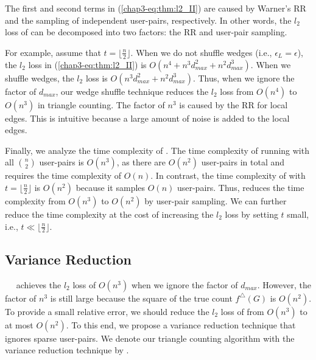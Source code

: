 The first and second terms in (\ref{chap3-eq:thm:l2_II}) are caused by 
Warner's RR 
and the sampling of independent user-pairs, respectively. 
In other words, the $l_2$ loss of \AlgWSTri{} can be decomposed into two factors: the RR 
and user-pair sampling. 

For example, assume that $t = \lfloor \frac{n}{2} \rfloor$. 
When we do not shuffle wedges (i.e., $\epsilon_L = \epsilon$), the $l_2$ loss in (\ref{chap3-eq:thm:l2_II}) is $O(n^4 + n^3 d_{max}^2 + n^2 d_{max}^3)$. 
When we shuffle wedges, the $l_2$ loss is $O(n^3 d_{max}^2 + n^2 d_{max}^3)$. 
Thus, when we ignore the factor of $d_{max}$, our wedge shuffle technique reduces the $l_2$ loss from $O(n^4)$ to $O(n^3)$ in triangle counting. 
The factor of $n^3$ is caused by the RR for local edges. 
This is intuitive because a large amount of noise is added to the local edges. 

Finally, we analyze the time complexity of \AlgWSTri{}. 
The time complexity of running \AlgWSLE{} with all $\binom{n}{2}$ user-pairs is $O(n^3)$, as there are $O(n^2)$ user-pairs in total and \AlgWSLE{} requires the time complexity of $O(n)$. 
In contrast, the time complexity of \AlgWSTri{} with $t = \lfloor \frac{n}{2} \rfloor$ is $O(n^2)$ because it samples $O(n)$ user-pairs. 
Thus, \AlgWSTri{} reduces the time complexity from $O(n^3)$ to $O(n^2)$ by user-pair sampling. 
We can further reduce the time complexity at the cost of increasing the $l_2$ loss 
by setting $t$ small, 
i.e., $t \ll \lfloor \frac{n}{2} \rfloor$. 

\subsection{Variance Reduction}
\label{chap3-sub:var_red}
~~\AlgWSTri{} 
achieves the $l_2$ loss of $O(n^3)$ when we ignore the factor of $d_{max}$. 
However, the factor of $n^3$ is still large because the square of the true count $f^\triangle(G)$ is $O(n^2)$. 
To provide a small relative error, we should reduce the $l_2$ loss of \AlgWSTri{} from $O(n^3)$ to at most $O(n^2)$. 
To this end, we propose a variance reduction technique that ignores sparse user-pairs. 
We denote our triangle counting algorithm with the variance reduction technique by \AlgWSTriVR{}. 


